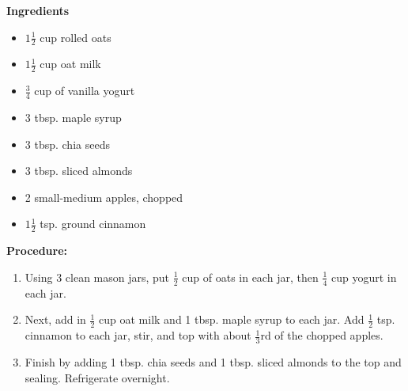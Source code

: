 \begin{multicols}{2}
\textbf{Ingredients}
\begin{itemize}
\item $1\frac{1}{2}$ cup rolled oats
\item $1\frac{1}{2}$ cup oat milk 
\item $\frac{3}{4}$ cup of vanilla yogurt 
\item 3 tbsp. maple syrup 
\item 3 tbsp. chia seeds 
\item 3 tbsp. sliced almonds 
\item 2 small-medium apples, chopped
\item $1\frac{1}{2}$ tsp. ground cinnamon




\end{itemize}


\columnbreak
\textbf{Procedure:}
\medskip


\begin{enumerate}
\item Using 3 clean mason jars, put $\frac{1}{2}$ cup of oats in each jar, then $\frac{1}{4}$ cup yogurt in each jar. 

\item Next, add in $\frac{1}{2}$ cup oat milk and 1 tbsp. maple syrup to each jar. Add $\frac{1}{2}$ tsp. cinnamon to each jar, stir, and top with about $\frac{1}{3}$rd of the chopped apples. 

\item Finish by adding 1 tbsp. chia seeds and 1 tbsp. sliced almonds to the top and sealing. Refrigerate overnight.

 
\end{enumerate}
\end{multicols}
